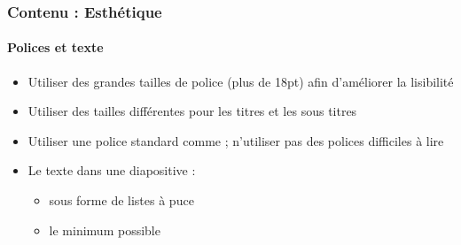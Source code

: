 \documentclass[xcolor=table, usenames,dvipsnames]{beamer}
\begin{document}
\begin{frame}
\frametitle{Contenu : Esthétique}
\framesubtitle{Polices et texte}

\begin{itemize}
	\item Utiliser des grandes tailles de police (plus de 18pt) afin d'améliorer la lisibilité 
	\item Utiliser des tailles différentes pour les titres et les sous titres 
	\item Utiliser une police standard comme  ; n'utiliser pas des polices difficiles à lire
	\item Le texte dans une diapositive : 
	\begin{itemize}
		\item sous forme de listes à puce
		\item le minimum possible
	\end{itemize}
\end{itemize}

\end{frame}
\end{document}
